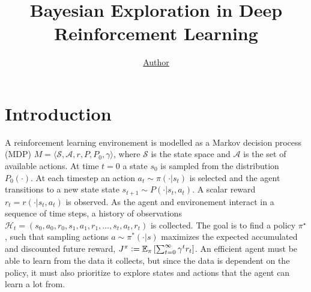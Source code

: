 \documentclass[]{uai2021} %
\title{Bayesian Exploration in Deep Reinforcement Learning}
\author[1]{\href{mailto:<jj@example.edu>?Subject=LALAL}{Author}{}}
\newcommand{\defeq}{\vcentcolon=}
\newcommand{\E}{\mathbb{E}}
\newcommand{\state}{\mathcal{S}}
\newcommand{\action}{\mathcal{A}}
\begin{document}
\maketitle

\begin{abstract}
\end{abstract}


\section{Introduction}
A reinforcement learning environement is modelled as a Markov decision process (MDP)
\(M = \langle \state, \action, r, P, P_0, \gamma \rangle\), where \(\state\) is the
state space and \(\action\) is the set of available actions. At time \(t=0\) a state
\(s_0\) is sampled from the distribution \(P_0(\cdot)\). At each timestep an action
\(a_t \sim \pi(\cdot \vert s_t)\) is selected and the agent transitions to a new state
state \(s_{t+1} \sim P(\cdot \vert s_t, a_t)\). A scalar reward
\(r_t = r(\cdot \vert s_t, a_t)\) is observed. As the agent and environement
interact in a sequence of time steps, a history of observations
\(\mathcal{H}_t = (s_0, a_0, r_0, s_1, a_1, r_1, \dots, s_t, a_t, r_t)\) is collected.
The goal is to find a policy \(\pi^\star\), such that sampling actions
\(a \sim \pi^*(\cdot \vert s)\) maximizes the expected accumulated and discounted future reward,
\(J^\pi \defeq \E_\pi \left[ \sum_{t=0}^\infty \gamma^t r_t \right]\). An efficient
agent must be able to learn from the data it collects, but since the data is
dependent on the policy, it must also prioritize to explore states and actions that
the agent can learn a lot from.
\end{document}
